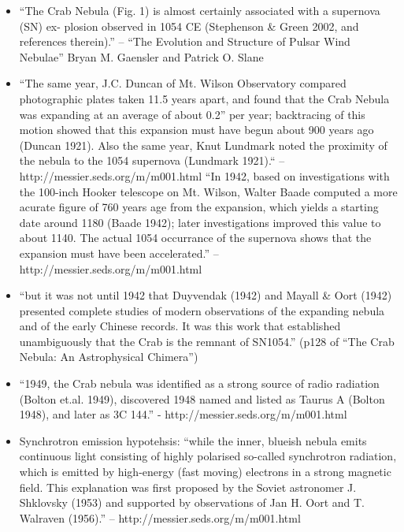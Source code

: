 \cite{lundmark_1921a_suspected-stars}

\begin{itemize}
  \item 
    ``The Crab Nebula (Fig. 1) is almost certainly associated with a
    supernova (SN) ex- plosion observed in 1054 CE (Stephenson \& Green
    2002, and references therein).'' -- ``The Evolution and Structure of Pulsar Wind Nebulae'' 
    Bryan M. Gaensler and Patrick O. Slane
  \item ``The same year, J.C. Duncan of Mt. Wilson Observatory compared
    photographic plates taken 11.5 years apart, and found that the
    Crab Nebula was expanding at an average of about 0.2'' per year;
    backtracing of this motion showed that this expansion must have
    begun about 900 years ago (Duncan 1921). Also the same year, Knut
    Lundmark noted the proximity of the nebula to the 1054 supernova
    (Lundmark 1921).`` -- http://messier.seds.org/m/m001.html
    ``In 1942, based on investigations with the 100-inch Hooker telescope
    on Mt. Wilson, Walter Baade computed a more acurate figure of 760
    years age from the expansion, which yields a starting date around
    1180 (Baade 1942); later investigations improved this value to about
    1140. The actual 1054 occurrance of the supernova shows that the
    expansion must have been accelerated.'' -- http://messier.seds.org/m/m001.html
  \item ``but it was not until 1942 that Duyvendak (1942) and Mayall \&
    Oort (1942) presented complete studies of modern observations of the
    expanding nebula and of the early Chinese records. It was this work
    that established unambiguously that the Crab is the remnant of SN1054.''
    (p128 of ``The Crab Nebula: An Astrophysical Chimera'')
  \item ``1949, the Crab nebula was identified as a strong source
    of radio radiation (Bolton et.al. 1949), discovered 1948 named
    and listed as Taurus A (Bolton 1948), and later as 3C 144.'' -
    http://messier.seds.org/m/m001.html
  \item Synchrotron emission hypotehsis: ``while the inner, blueish
      nebula emits continuous light consisting of highly polarised so-called
      synchrotron radiation, which is emitted by high-energy (fast moving)
      electrons in a strong magnetic field. This explanation was first
      proposed by the Soviet astronomer J. Shklovsky (1953) and supported
      by observations of Jan H. Oort and T. Walraven (1956).'' -- http://messier.seds.org/m/m001.html

\end{itemize}
